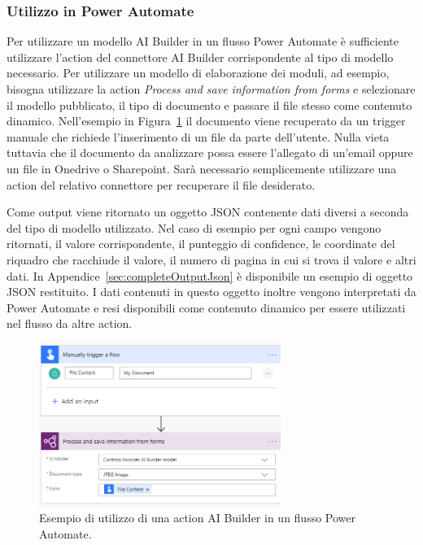 \subsubsection{Utilizzo in Power Automate}
\label{ssec:utilizzoInPowerAutomate}
Per utilizzare un modello AI Builder in un flusso Power Automate è sufficiente utilizzare l'action  del connettore AI Builder corrispondente al tipo di modello necessario. Per utilizzare un modello di elaborazione dei moduli, ad esempio, bisogna utilizzare la action \textit{Process and save information from forms} e selezionare il modello pubblicato, il tipo di documento e passare il file stesso come contenuto dinamico. Nell'esempio in Figura~\ref{fig:flowAIBuilder} il documento viene recuperato da un trigger manuale che richiede l'inserimento di un file da parte dell'utente. Nulla vieta tuttavia che il documento da analizzare possa essere l'allegato di un'email oppure un file in Onedrive o Sharepoint. Sarà necessario semplicemente utilizzare una action del relativo connettore per recuperare il file desiderato.

Come output viene ritornato un oggetto JSON contenente dati diversi a seconda del tipo di modello utilizzato. Nel caso di esempio per ogni campo vengono ritornati, il valore corrispondente, il punteggio di confidence, le coordinate del riquadro che racchiude il valore, il numero di pagina in cui si trova il valore e altri dati. In Appendice~\ref{sec:completeOutputJson} è disponibile un esempio di oggetto JSON restituito.
I dati contenuti in questo oggetto inoltre vengono interpretati da Power Automate e resi disponibili come contenuto dinamico per essere utilizzati nel flusso da altre action.

\begin{figure}[!ht]
  \centering
  \includegraphics[width=0.7\textwidth]{flow-ai-builder.png}
  \caption{Esempio di utilizzo di una action AI Builder in un flusso Power Automate.}
  \label{fig:flowAIBuilder}
\end{figure}

